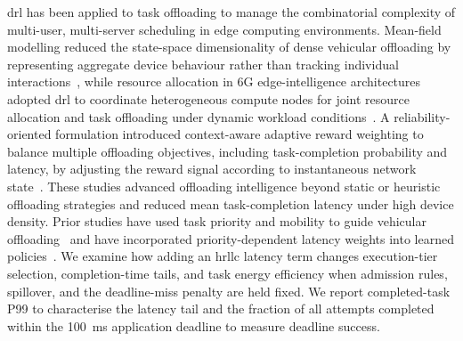 \documentclass[journal]{IEEEtran}
\begin{document}

\ac{drl} has been applied to task offloading to manage the combinatorial complexity of multi-user, multi-server scheduling in edge computing environments. Mean-field modelling reduced the state-space dimensionality of dense vehicular offloading by representing aggregate device behaviour rather than tracking individual interactions~\cite{RW05}, while resource allocation in 6G edge-intelligence architectures adopted \ac{drl} to coordinate heterogeneous compute nodes for joint resource allocation and task offloading under dynamic workload conditions~\cite{RW06,Wu2024CloudEdgeEnd}. A reliability-oriented formulation introduced context-aware adaptive reward weighting to balance multiple offloading objectives, including task-completion probability and latency, by adjusting the reward signal according to instantaneous network state~\cite{RW08,Hao2025ReliabilityUAV}. These studies advanced offloading intelligence beyond static or heuristic offloading strategies and reduced mean task-completion latency under high device density. Prior studies have used task priority and mobility to guide vehicular offloading~\cite{Badshah2026PMAQL} and have incorporated priority-dependent latency weights into learned policies~\cite{Uddin2024Prioritized,Barai2026PriorityIoT}. We examine how adding an \acs{hrllc} latency term changes execution-tier selection, completion-time tails, and task energy efficiency when admission rules, spillover, and the deadline-miss penalty are held fixed. We report completed-task P99 to characterise the latency tail and the fraction of all attempts completed within the 100~ms application deadline to measure deadline success.

\end{document}

